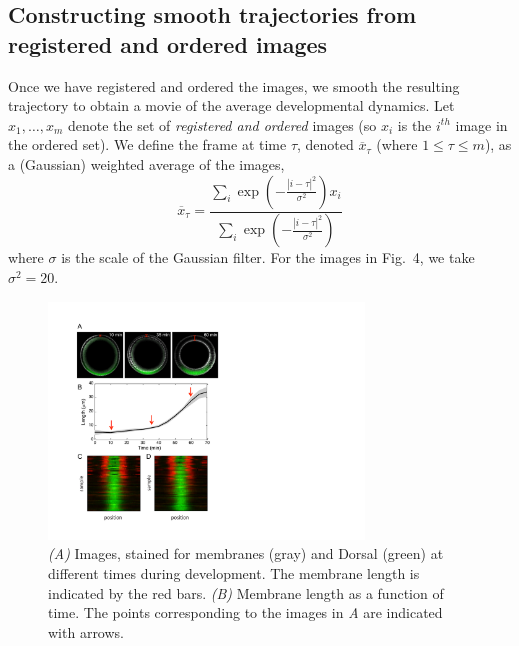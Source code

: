 \documentclass{pnastwo}
\newcommand{\fig}[0]{Fig.}
\begin{document}
\begin{article}
\subsection{Constructing smooth trajectories from registered and ordered images}

Once we have registered and ordered the images, we smooth the resulting trajectory to obtain a movie of the average developmental dynamics. 
%
Let $x_1, \dots, x_m$ denote the set of {\em registered and ordered} images (so $x_i$ is the $i^{th}$ image in the ordered set).
%
We define the frame at time $\tau$, denoted $\overline{x}_{\tau}$ (where $1 \le \tau \le m$), as a (Gaussian) weighted average of the images,
\begin{equation}
\overline{x}_{\tau} =  \frac{\sum_i \exp \left( - \frac{|i - \tau|^2}{\sigma^2} \right) x_i}{\sum_i \exp \left( - \frac{|i - \tau|^2}{\sigma^2} \right) }
\end{equation}
where $\sigma$ is the scale of the Gaussian filter. 
%
For the images in \fig~4, we take $\sigma^2 = 20$.






\end{article}

\begin{figure}
\includegraphics[width=8.4cm, trim=0cm 5.6cm 0cm 0cm, clip]{SI_fig6}
\caption{{\it (A)} Images, stained for membranes (gray) and Dorsal (green) at different times during development. The membrane length is indicated by the red bars. {\it (B)} Membrane length as a function of time. The points corresponding to the images in {\it A} are indicated with arrows.}
\label{fig:membrane_compare}
\end{figure}
\end{document}
